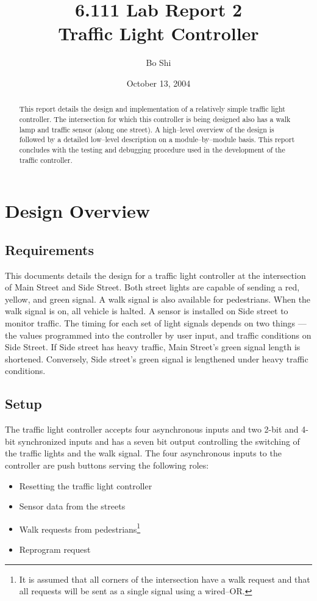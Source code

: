 \documentclass[11]{article}
\author{Bo Shi}
\title{6.111 Lab Report 2 \\ Traffic Light Controller}
\date{October 13, 2004}
\begin{document}
\maketitle

\begin{abstract}
This report details the design and implementation of a relatively simple
traffic light controller.  The intersection for which this controller is being
designed also has a walk lamp and traffic sensor (along one street).  A
high--level overview of the design is followed by a detailed low--level
description on a module--by--module basis.  This report concludes with the
testing and debugging procedure used in the development of the traffic
controller.
\end{abstract}

\newpage
\tableofcontents

\newpage
\listoffigures 
\listoftables 

\newpage
\section{Design Overview}
	\subsection{Requirements}
	This documents details the design for a traffic light controller at the
	intersection of Main Street and Side Street.  Both street lights are
	capable of sending a red, yellow, and green signal.  A walk signal is also
	available for pedestrians.  When the walk signal is on, all vehicle is
	halted.  A sensor is installed on Side street to monitor traffic.  The
	timing for each set of light signals depends on two things --- the values
	programmed into the controller by user input, and traffic conditions on
	Side Street.  If Side street has heavy traffic, Main Street's green signal
	length is shortened.  Conversely, Side street's green signal is lengthened
	under heavy traffic conditions.

	\subsection{Setup}
	The traffic light controller accepts four asynchronous inputs and two
	2-bit and 4-bit synchronized inputs and has a seven bit output
	controlling the switching of the traffic lights and the walk signal.
	The four asynchronous inputs to the controller are push buttons serving
	the following roles:
	\begin{itemize}
		\item Resetting the traffic light controller
		\item Sensor data from the streets
		\item Walk requests from pedestrians\footnote{It is assumed that all corners of the intersection have a walk request and that all requests will be sent as a single signal using a wired--OR.}
		\item Reprogram request
	\end{itemize}
\end{document}
